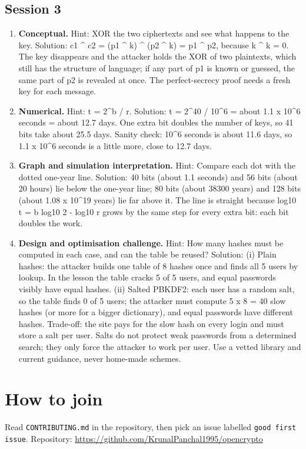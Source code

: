 \documentclass[11pt,a4paper]{article}
\begin{document}
\subsection*{Session 3}
\begin{enumerate}[nosep]
\item \textbf{Conceptual.} Hint: XOR the two ciphertexts and see what happens to the key. Solution: c1 \textasciicircum{} c2 = (p1 \textasciicircum{} k) \textasciicircum{} (p2 \textasciicircum{} k) = p1 \textasciicircum{} p2, because k \textasciicircum{} k = 0. The key disappears and the attacker holds the XOR of two plaintexts, which still has the structure of language; if any part of p1 is known or guessed, the same part of p2 is revealed at once. The perfect-secrecy proof needs a fresh key for each message.
\item \textbf{Numerical.} Hint: t = 2\textasciicircum{}b / r. Solution: t = 2\textasciicircum{}40 / 10\textasciicircum{}6 = about 1.1 x 10\textasciicircum{}6 seconds = about 12.7 days. One extra bit doubles the number of keys, so 41 bits take about 25.5 days. Sanity check: 10\textasciicircum{}6 seconds is about 11.6 days, so 1.1 x 10\textasciicircum{}6 seconds is a little more, close to 12.7 days.
\item \textbf{Graph and simulation interpretation.} Hint: Compare each dot with the dotted one-year line. Solution: 40 bits (about 1.1 seconds) and 56 bits (about 20 hours) lie below the one-year line; 80 bits (about 38300 years) and 128 bits (about 1.08 x 10\textasciicircum{}19 years) lie far above it. The line is straight because log10 t = b log10 2 - log10 r grows by the same step for every extra bit: each bit doubles the work.
\item \textbf{Design and optimisation challenge.} Hint: How many hashes must be computed in each case, and can the table be reused? Solution: (i) Plain hashes: the attacker builds one table of 8 hashes once and finds all 5 users by lookup. In the lesson the table cracks 5 of 5 users, and equal passwords visibly have equal hashes. (ii) Salted PBKDF2: each user has a random salt, so the table finds 0 of 5 users; the attacker must compute 5 x 8 = 40 slow hashes (or more for a bigger dictionary), and equal passwords have different hashes. Trade-off: the site pays for the slow hash on every login and must store a salt per user. Salts do not protect weak passwords from a determined search; they only force the attacker to work per user. Use a vetted library and current guidance, never home-made schemes.
\end{enumerate}

\section{How to join}
Read \texttt{CONTRIBUTING.md} in the repository, then pick an issue labelled \texttt{good first issue}. Repository: \url{https://github.com/KrunalPanchal1995/opencrypto}
\end{document}
